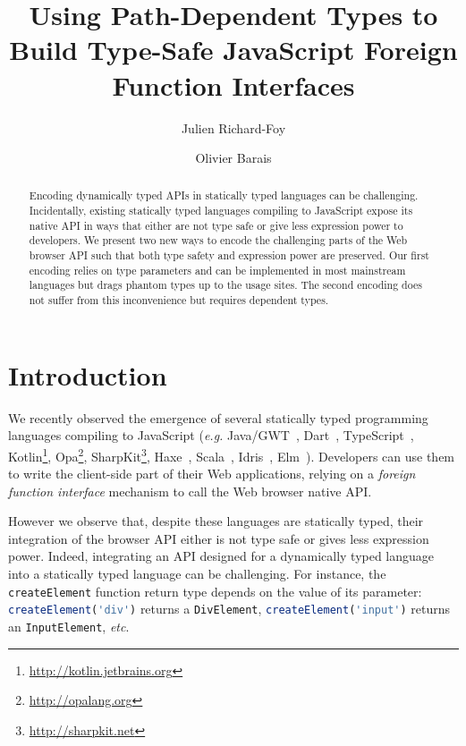 \documentclass{llncs}
\newcommand{\jscode}[1]{\lstinline[language=JavaScript]|#1|}
\begin{document}
\renewcommand{\thelstlisting}{\arabic{lstlisting}}

 \title{Using Path-Dependent Types to Build Type-Safe JavaScript Foreign Function Interfaces}

 \author{Julien Richard-Foy \and Olivier Barais}



 \maketitle

\begin{abstract}
Encoding dynamically typed APIs in statically typed languages can be challenging. Incidentally, existing statically typed languages compiling to JavaScript expose its native API in ways that either are not type safe or give less expression power to developers. We present two new ways to encode the challenging parts of the Web browser API such that both type safety and expression power are preserved. Our first encoding relies on type parameters and can be implemented in most mainstream languages but drags phantom types up to the usage sites. The second encoding does not suffer from this inconvenience but requires dependent types.
\end{abstract}

\section{Introduction}

We recently observed the emergence of several statically typed programming languages compiling to JavaScript (\emph{e.g.} Java/GWT~\cite{Kereki09_GWT}, Dart~\cite{Griffith11_Dart}, TypeScript~\cite{fenton2012typescript}, Kotlin\footnote{\href{http://kotlin.jetbrains.org}{http://kotlin.jetbrains.org}}, Opa\footnote{\href{http://opalang.org}{http://opalang.org}}, SharpKit\footnote{\href{http://sharpkit.net}{http://sharpkit.net}}, Haxe~\cite{Cannasse08_HaXe}, Scala~\cite{Doeraene13_ScalaJs}, Idris~\cite{Brady13_Idris}, Elm~\cite{czaplicki2012elm}). Developers can use them to write the client-side part of their Web applications, relying on a \emph{foreign function interface} mechanism to call the Web browser native API.

However we observe that, despite these languages are statically typed, their integration of the browser API either is not type safe or gives less expression power. Indeed, integrating an API designed for a dynamically typed language into a statically typed language can be challenging. For instance, the \jscode{createElement} function return type depends on the value of its parameter: \jscode{createElement('div')} returns a \jscode{DivElement}, \jscode{createElement('input')} returns an \jscode{InputElement}, \emph{etc}.
\end{document}
